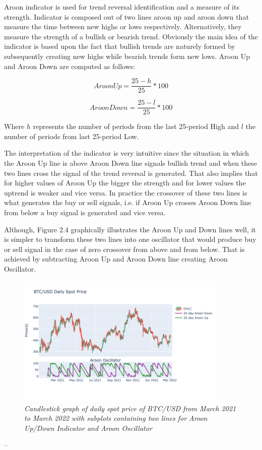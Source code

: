 Aroon indicator is used for trend reversal identification and a measure of its strength. Indicator is composed out of two lines aroon up and aroon down that measure the time between new highs or lows respectively. Alternatively, they measure the strength of a bullish or bearish trend. Obviously the main idea of the indicator is based upon the fact that bullish trends are naturely formed by subsequently creating new highs while bearish trends form new lows. Aroon Up and Aroon Down are computed as follows:

\begin{equation}
Aroon Up = \frac{25 - h}{25} * 100
\end{equation}
 
\begin{equation}
Aroon Down = \frac{25 - l}{25} * 100
\end{equation}

Where $h$ represents the number of periods from the last 25-period High and $l$ the number of periods from last 25-period Low. 

The interpretation of the indicator is very intuitive since the situation in which the Aroon Up line is above Aroon Down line signals bullish trend and when these two lines cross the signal of the trend reversal is generated. That also implies that for higher values of Aroon Up the bigger the strength and for lower values the uptrend is weaker and vice versa. In practice the crossover of these two lines is what generates the buy or sell signals, i.e. if Aroon Up crosses Aroon Down line from below a buy signal is generated and vice versa. 

Although, Figure 2.4 graphically illustrates the Aroon Up and Down lines well, it is simpler to transform these two lines into one oscillator that would produce buy or sell signal in the case of zero crossover from above and from below. That is achieved by subtracting Aroon Up and Aroon Down line creating Aroon Oscillator.


\begin{figure}[ht]

\begin{center}
	\includegraphics[width=0.9\textwidth]{Aroon.png}
\end{center}

\caption{\textit{ Candlestick graph of daily spot price of BTC/USD from March 2021 to March 2022 with subplots containing two lines for Aroon Up/Down Indicator and Aroon Oscillator}}

\end{figure}


--




